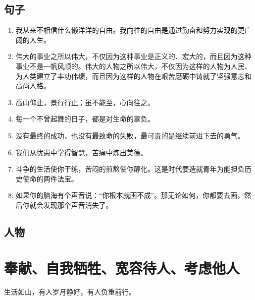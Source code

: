 \subsection{句子}
\begin{enumerate}
\item 我从来不相信什么懒洋洋的自由。我向往的自由是通过勤奋和努力实现的更广阔的人生。
\item 伟大的事业之所以伟大，不仅因为这种事业是正义的、宏大的，而且因为这种事业不是一帆风顺的。伟大的人物之所以伟大，不仅因为这样的人物为人民、为人类建立了丰功伟绩，而且因为这样的人物在艰苦磨砺中铸就了坚强意志和高尚人格。
\item 高山仰止，景行行止；虽不能至，心向往之。
\item 每一个不曾起舞的日子，都是对生命的辜负。
\item 没有最终的成功，也没有最致命的失败，最可贵的是继续前进下去的勇气。
\item 我们从忧患中学得智慧，苦痛中炼出美德。
\item 斗争的生活使你干练，苦闷的煎熬使你醇化。这是时代要造就青年为能担负历史使命的两件法宝。
\item 如果你的脑海有个声音说：“你根本就画不成”。那无论如何，你都要去画，然后你就会发现那个声音消失了。
\end{enumerate}

\subsection{人物}


\section{奉献、自我牺牲、宽容待人、考虑他人}
生活如山，有人岁月静好，有人负重前行。
